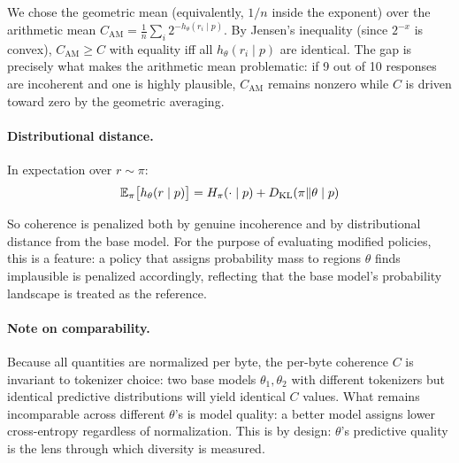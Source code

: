 We chose the geometric mean (equivalently, $1/n$ inside the exponent) over the arithmetic mean $C_{\mathrm{AM}} = \frac{1}{n}\sum_i 2^{-h_\theta(r_i \mid p)}$.
By Jensen's inequality (since $2^{-x}$ is convex), $C_{\mathrm{AM}} \geq C$ with equality iff all $h_\theta(r_i \mid p)$ are identical.
The gap is precisely what makes the arithmetic mean problematic: if 9 out of 10 responses are incoherent and one is highly plausible, $C_{\mathrm{AM}}$ remains nonzero while $C$ is driven toward zero by the geometric averaging.

\paragraph{Distributional distance.} In expectation over $r \sim \pi$:
\begin{equation}
    \mathbb{E}_\pi\bigl[h_\theta(r \mid p)\bigr] = H_\pi(\cdot \mid p) + D_{\mathrm{KL}}(\pi \| \theta \mid p)
\end{equation}

So coherence is penalized both by genuine incoherence and by distributional distance from the base model.
For the purpose of evaluating modified policies, this is a feature: a policy that assigns probability mass to regions $\theta$ finds implausible is penalized accordingly, reflecting that the base model's probability landscape is treated as the reference.

\paragraph{Note on comparability.} Because all quantities are normalized per byte, the per-byte coherence $C$ is invariant to tokenizer choice: two base models $\theta_1, \theta_2$ with different tokenizers but identical predictive distributions will yield identical $C$ values.
What remains incomparable across different $\theta$'s is model quality: a better model assigns lower cross-entropy regardless of normalization.
This is by design: $\theta$'s predictive quality is the lens through which diversity is measured.

